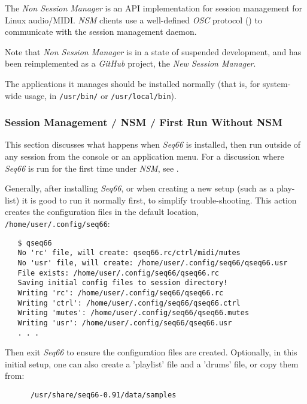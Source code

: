    The \textsl{Non Session Manager} is an API implementation for session
   management for Linux audio/MIDI.
   \textsl{NSM} clients use a well-defined
   \textsl{OSC} protocol (\cite{osc})
   to communicate with the session management daemon.

   Note that \textsl{Non Session Manager} is in a state of suspended
   development, and has been reimplemented as a \textsl{GitHub} project,
   the \textsl{New Session Manager}.

   The applications it manages should be installed normally (that is,
   for system-wide usage, in
   \texttt{/usr/bin/} or \texttt{/usr/local/bin}).

\subsubsection{Session Management / NSM / First Run Without NSM}
\label{subsec:sessions_nsm_first_run_without_nsm}

   This section discusses what happens when \textsl{Seq66} is installed, then
   run outside of any session from the console or an application menu.
   For a discussion where \textsl{Seq66} is run for the first time under
   \textsl{NSM},
   see .

   Generally, after installing \textsl{Seq66}, or when creating a new setup
   (such as a play-list) it is good to run it normally first, to simplify
   trouble-shooting.
   This action creates the configuration files in the default location,
   \texttt{/home/user/.config/seq66}:

\begin{verbatim}
   $ qseq66 
   No 'rc' file, will create: qseq66.rc/ctrl/midi/mutes
   No 'usr' file, will create: /home/user/.config/seq66/qseq66.usr
   File exists: /home/user/.config/seq66/qseq66.rc
   Saving initial config files to session directory!
   Writing 'rc': /home/user/.config/seq66/qseq66.rc
   Writing 'ctrl': /home/user/.config/seq66/qseq66.ctrl
   Writing 'mutes': /home/user/.config/seq66/qseq66.mutes
   Writing 'usr': /home/user/.config/seq66/qseq66.usr
   . . .
\end{verbatim}

   Then exit \textsl{Seq66} to ensure the configuration files are created.
   Optionally, in this initial setup,
   one can also create a 'playlist' file and a 'drums' file, or
   copy them from:

   \begin{verbatim}
      /usr/share/seq66-0.91/data/samples
   \end{verbatim}

